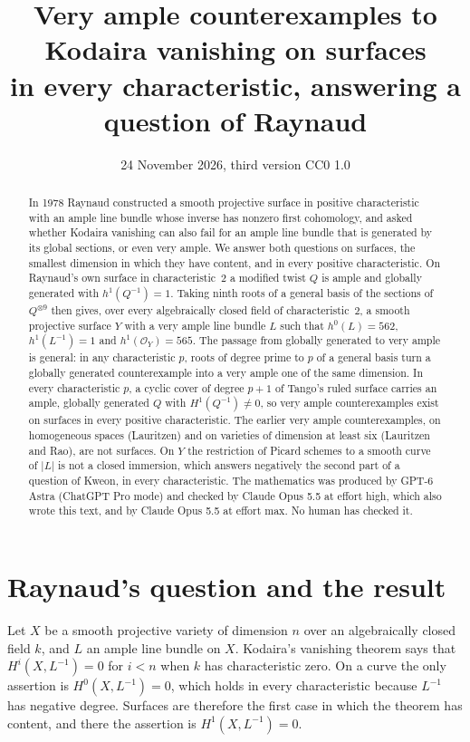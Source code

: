\documentclass[11pt,a4paper]{article}
\title{Very ample counterexamples to Kodaira vanishing on surfaces\\ in every characteristic, answering a question of Raynaud}
\author{}
\date{24 November 2026, third version \quad CC0 1.0}
\theoremstyle{plain}
\theoremstyle{remark}
\newcommand{\OO}{\mathcal O}
\begin{document}
\maketitle

\begin{abstract}
\noindent
In 1978 Raynaud constructed a smooth projective surface in positive characteristic with an ample line bundle whose
inverse has nonzero first cohomology, and asked whether Kodaira vanishing can also fail for an ample line bundle that
is generated by its global sections, or even very ample. We answer both questions on surfaces, the smallest dimension
in which they have content, and in every positive characteristic. On Raynaud's own surface in characteristic~$2$ a modified twist $Q$ is ample and globally
generated with $h^1(Q^{-1})=1$. Taking ninth roots of a general basis of the sections of $Q^{\otimes 9}$ then gives,
over every algebraically closed field of characteristic~$2$, a smooth projective surface $Y$ with a very ample line
bundle $L$ such that $h^0(L)=562$, $h^1(L^{-1})=1$ and $h^1(\OO_Y)=565$. The passage from globally generated to very
ample is general: in any characteristic $p$, roots of degree prime to $p$ of a general basis turn a globally generated
counterexample into a very ample one of the same dimension. In every characteristic $p$, a cyclic cover of degree $p+1$ of
Tango's ruled surface carries an ample, globally generated $Q$ with $H^1(Q^{-1})\ne0$, so very ample counterexamples
exist on surfaces in every positive characteristic. The earlier very ample counterexamples, on homogeneous
spaces (Lauritzen) and on varieties of dimension at least six (Lauritzen and Rao), are not surfaces. On $Y$ the
restriction of Picard schemes to a smooth curve of $|L|$ is not a closed immersion, which answers negatively the
second part of a question of Kweon, in every characteristic. The mathematics was produced by GPT-6 Astra (ChatGPT Pro
mode) and checked by Claude Opus 5.5 at effort high, which also wrote this text, and by Claude Opus 5.5 at effort max. No human
has checked it.
\end{abstract}

\section{Raynaud's question and the result}

Let $X$ be a smooth projective variety of dimension $n$ over an algebraically closed field $k$, and $L$ an ample line
bundle on $X$. Kodaira's vanishing theorem says that $H^i(X,L^{-1})=0$ for $i<n$ when $k$ has characteristic zero. On
a curve the only assertion is $H^0(X,L^{-1})=0$, which holds in every characteristic because $L^{-1}$ has negative
degree. Surfaces are therefore the first case in which the theorem has content, and there the assertion is
$H^1(X,L^{-1})=0$.
\end{document}
